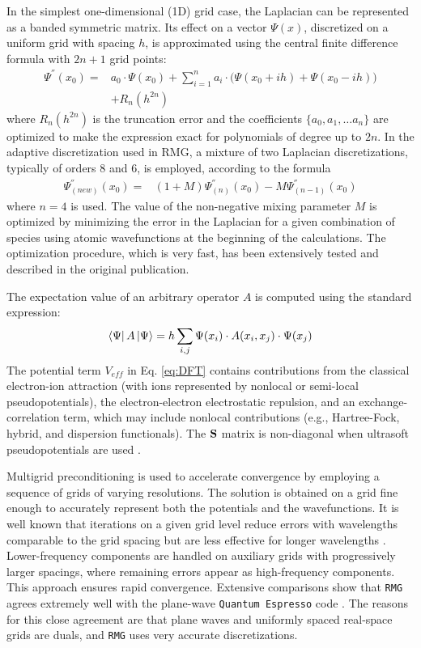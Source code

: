 \documentclass[journal=jctcce,manuscript=article,etalmode=truncate,maxauthors=10,layout=twocolumn,9pt]{achemso}   %
\begin{document}
In the simplest one-dimensional (1D) grid case, the Laplacian can be represented as a banded symmetric matrix. Its effect on a vector $\Psi(x)$, discretized on a uniform grid with spacing $h$, is approximated using the central finite difference formula with $2n+1$ grid points:
\begin{align} 
\Psi^{''}(x_0) =& a_0 \cdot \Psi(x_0) + \sum_{i=1}^{n} a_i \cdot \big(\Psi(x_0+ ih) + \Psi(x_0-ih) \big) \nonumber \\ 
     & + R_n(h^{2n})
\end{align}
where  $R_n(h^{2n})$ is the truncation error and the coefficients  $\{a_0, a_1, \ldots a_n \}$ 
are optimized to make the expression exact for polynomials of degree up to
$2n$. In the adaptive discretization used in RMG, a mixture of two Laplacian discretizations, typically of orders 8 and 6, is employed, according to the formula\cite{rmg-dft-2024}
\begin{align} 
\Psi^{''}_{(new)}(x_0) =& (1+M)\Psi^{''}_{(n)}(x_0) -M\Psi^{''}_{(n-1)}(x_0)
\end{align}
where $n=4$ is used. The value of the non-negative mixing parameter $M$ is optimized by minimizing the error in the Laplacian for a given combination of species using atomic wavefunctions at the beginning of the calculations. The optimization procedure, which is very fast, has been extensively tested and described in the original publication.\cite{rmg-dft-2024} 

The expectation value of an arbitrary operator $A$ is computed using the standard expression:
\begin{align}  
\bra{\Psi} A \ket{\Psi} = h \sum_{i,j}     \Psi(x_i) \cdot A(x_i,x_j) \cdot \Psi(x_j)
\end{align}
The potential term $V_{eff}$ in Eq. \ref{eq:DFT} contains contributions from the classical electron-ion attraction (with ions represented by nonlocal or semi-local pseudopotentials), the electron-electron electrostatic repulsion, and an exchange-correlation term, which may include nonlocal contributions (e.g., Hartree-Fock, hybrid, and dispersion functionals). The $\vb S$ matrix is non-diagonal when ultrasoft pseudopotentials are used \cite{Vanderbilt-1990}.

Multigrid preconditioning is used to accelerate convergence by employing a sequence of grids of varying resolutions. The solution is obtained on a grid fine enough to accurately represent both the potentials and the wavefunctions. It is well known that iterations on a given grid level reduce errors with wavelengths comparable to the grid spacing but are less effective for longer wavelengths \cite{multigrids-Brandt-2011,multigrids-Briggs-2000}. Lower-frequency components are handled on auxiliary grids with progressively larger spacings, where remaining errors appear as high-frequency components. This approach ensures rapid convergence. Extensive comparisons show that \texttt{RMG} agrees extremely well \cite{rmg-dft-2024} with the plane-wave \texttt{Quantum Espresso} code \cite{QE-2017}. The reasons for this close agreement are that plane waves and uniformly spaced real-space grids are duals, and \texttt{RMG} uses very accurate discretizations.
\end{document}
